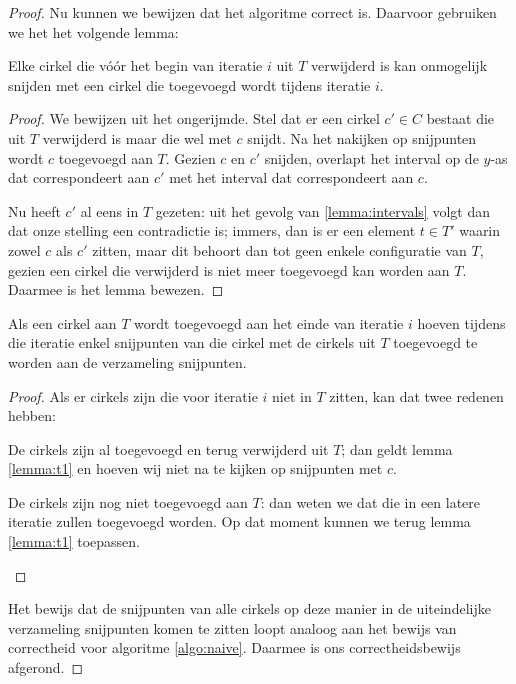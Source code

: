 \begin{proof}

Nu kunnen we bewijzen dat het algoritme correct is. Daarvoor gebruiken
we het het volgende lemma:

\begin{lemma}
Elke cirkel die v\'o\'or het begin van iteratie $i$ uit $T$ verwijderd is
kan onmogelijk snijden met een cirkel die toegevoegd wordt tijdens
iteratie $i$.
\label{lemma:t1}
\end{lemma}

\begin{proof}
We bewijzen uit het ongerijmde. Stel dat er een cirkel $c' \in C$
bestaat die uit $T$ verwijderd is maar die wel met $c$ snijdt. Na het
nakijken op snijpunten wordt $c$ toegevoegd aan $T$. Gezien $c$ en
$c'$ snijden, overlapt het interval op de $y$-as dat correspondeert
aan $c'$ met het interval dat correspondeert aan $c$.

Nu heeft $c'$ al eens in $T$ gezeten: uit het gevolg van
\ref{lemma:intervals} volgt dan dat onze stelling een contradictie is;
immers, dan is er een element $t \in T'$ waarin zowel $c$ als $c'$
zitten, maar dit behoort dan tot geen enkele configuratie van $T$,
gezien een cirkel die verwijderd is niet meer toegevoegd kan worden
aan $T$. Daarmee is het lemma bewezen.
\end{proof}

\begin{gevolg} 
Als een cirkel aan $T$ wordt toegevoegd aan het einde van iteratie $i$
hoeven tijdens die iteratie enkel snijpunten van die cirkel met de
cirkels uit $T$ toegevoegd te worden aan de verzameling snijpunten.
\end{gevolg} 
\begin{proof}
Als er cirkels zijn die voor iteratie $i$ niet in $T$ zitten, kan dat
twee redenen hebben:
\begin{geval}
De cirkels zijn al toegevoegd en terug verwijderd uit $T$; dan geldt
lemma \ref{lemma:t1} en hoeven wij niet na te kijken op snijpunten met
$c$.
\end{geval}
\begin{geval}
De cirkels zijn nog niet toegevoegd aan $T$: dan weten we dat die in
een latere iteratie zullen toegevoegd worden. Op dat moment kunnen
we terug lemma \ref{lemma:t1} toepassen.
\end{geval}
\end{proof}

Het bewijs dat de snijpunten van alle cirkels op deze manier in de
uiteindelijke verzameling snijpunten komen te zitten loopt analoog aan
het bewijs van correctheid voor algoritme \ref{algo:naive}. Daarmee is
ons correctheidsbewijs afgerond.
\end{proof}
